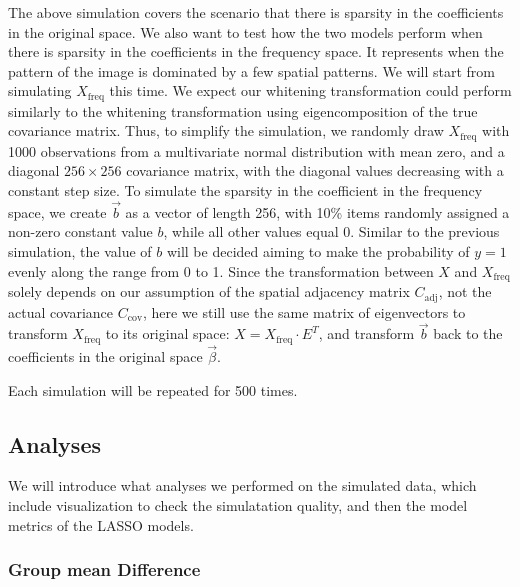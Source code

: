 \documentclass[12pt]{article}
\begin{document}
The above simulation covers the scenario that there is sparsity in the coefficients in the original space. We also want to test how the two models perform when there is sparsity in the coefficients in the frequency space. It represents when the pattern of the image is dominated by a few spatial patterns. We will start from simulating \( X_{\text{freq}} \) this time. We expect our whitening transformation could perform similarly to the whitening transformation using eigencomposition of the true covariance matrix. Thus, to simplify the simulation, we randomly draw \( X_{\text{freq}} \) with 1000 observations from a multivariate normal distribution with mean zero, and a diagonal \( 256 \times 256 \) covariance matrix, with the diagonal values decreasing with a constant step size. To simulate the sparsity in the coefficient in the frequency space, we create \( \vec{b} \) as a vector of length 256, with 10\% items randomly assigned a non-zero constant value \( b \), while all other values equal 0. Similar to the previous simulation, the value of \( b \) will be decided aiming to make the probability of \( y=1 \) evenly along the range from 0 to 1. Since the transformation between \( X \) and \( X_{\text{freq}} \) solely depends on our assumption of the spatial adjacency matrix \( C_{\text{adj}} \), not the actual covariance \( C_{\text{cov}} \), here we still use the same matrix of eigenvectors to transform \( X_{\text{freq}} \) to its original space: \( X = X_{\text{freq}} \cdot E^T \), and transform \( \vec{b} \) back to the coefficients in the original space \( \vec{\beta} \).

Each simulation will be repeated for 500 times.

\subsection{Analyses}

We will introduce what analyses we performed on the simulated data, which include visualization to check the simulatation quality, and then the model metrics of the LASSO models.

\subsubsection{Group mean Difference}
\end{document}

